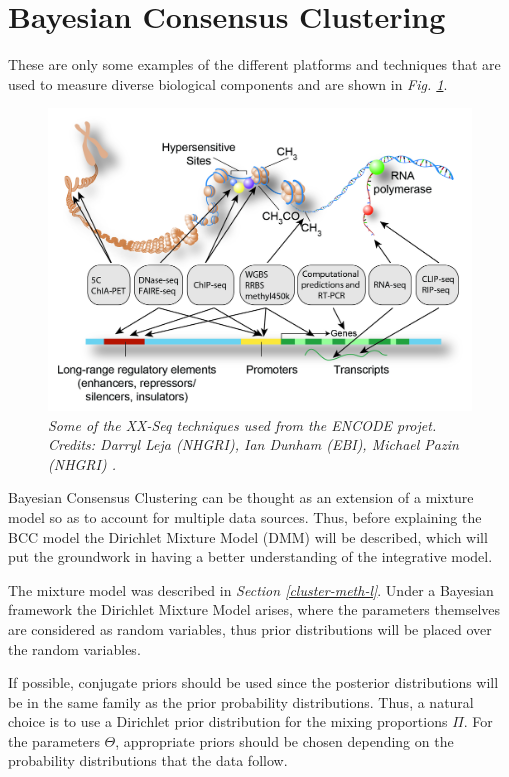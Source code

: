 \section{Bayesian Consensus Clustering} \label{bcc-sec-l}

These are only some examples of the different platforms and techniques that are used to measure diverse biological components and are shown in \emph{Fig. \ref{seq-pic}}. 

\begin{figure}[!ht]
\begin{center}
 \includegraphics[scale = 0.15]{images/encode-seq.png}
\caption{\emph{Some of the XX-Seq techniques used from the ENCODE projet. Credits: Darryl Leja (NHGRI), Ian Dunham (EBI), Michael Pazin (NHGRI) \citep{Dunham2012}.}}
\label{seq-pic}
\end{center}
\end{figure} 

Bayesian Consensus Clustering can be thought as an extension of a mixture model so as to account for multiple data sources. Thus, before explaining the BCC model the Dirichlet Mixture Model (DMM) will be described, which will put the groundwork in having a better understanding of the integrative model.

The mixture model was described in \emph{Section \ref{cluster-meth-l}}. Under a Bayesian framework the Dirichlet Mixture Model arises, where the parameters themselves are considered as random variables, thus prior distributions will be placed over the random variables. 

If possible, conjugate priors should be used since the posterior distributions will be in the same family as the prior probability distributions. Thus, a natural choice is to use a Dirichlet prior distribution for the mixing proportions $\Pi$. For the parameters $\Theta$, appropriate priors should be chosen depending on the probability distributions that the data follow.

